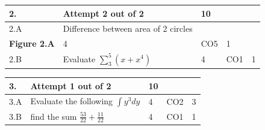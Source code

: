 \documentclass[12pt]{article}
\begin{document}
	\begin{tabular}{|L{1cm}|L{8cm}|C{1cm}|C{1cm}|C{1cm}|}\hline
	\bf2. & \bf{Attempt} \bf{2} \bf{out of} \bf{2} & \bf{10}  & & \\ \hline





		2.A &
	Difference between area of 2 circles \newline
			\begin{center}
		\includegraphics[width=4cm,height=3cm]{media/diagrams/diagram.png}\\\bf{Figure }\bf2.A		
	\end{center}
		
	 &  4 & CO5 & 1\\ \hline
		2.B &
	Evaluate $\displaystyle \sum_{3}^{5}(x+x^{4})$ \newline
			
	 &  4 & CO1 & 1\\ \hline
	\end{tabular}


\begin{tabular}{|L{1cm}|L{8cm}|C{1cm}|C{1cm}|C{1cm}|}\hline
	\bf3. & \bf{Attempt} \bf{1} \bf{out of} \bf{2} & \bf{10}  & & \\ \hline





		3.A &
	Evaluate the following $\int y^{3} dy$ \newline
			
	 &  4 & CO2 & 3\\ \hline
		3.B &
	find the sum $\frac{53}{22}+\frac{11}{22}$ \newline
			
	 &  4 & CO1 & 1\\ \hline
	\end{tabular}
\end{document}

